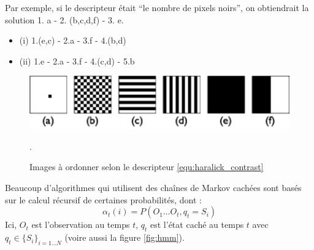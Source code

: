 \documentclass[11pt,addpoints]{exam}
\begin{document}
\begin{questions}
\begin{parts}
Par exemple, si le descripteur était ``le nombre de pixels noirs'', on
obtiendrait la solution 1. a - 2. (b,c,d,f) - 3. e. 
\begin{solution}
\begin{itemize}
\item (i) 1.(e,c) - 2.a - 3.f - 4.(b,d)
\item (ii) 1.e - 2.a - 3.f - 4.(c,d) - 5.b 
\end{itemize}
\end{solution}

\end{parts}

\begin{figure}[!ht]
\centering
\includegraphics[scale=0.8]{Haralick_question.pdf}
\caption{Images à ordonner selon le descripteur
  \ref{equ:haralick_contrast} }. 
\label{fig:haralick}
\end{figure}

Beaucoup d'algorithmes qui utilisent des chaînes de Markov cachées sont basés
sur le calcul récursif de certaines probabilités, dont : 
\begin{equation}\label{equ:alpha}
\alpha_t(i) = P(O_1\ldots O_t, q_t=S_i) 
\end{equation}
Ici, $O_t$ est l'observation au temps $t$, $q_t$ est l'état caché au
temps $t$ avec $q_t \in \{S_i\}_{i=1 \ldots N}$ (voire aussi la figure
\ref{fig:hmm}).

\end{questions}
\end{document}
